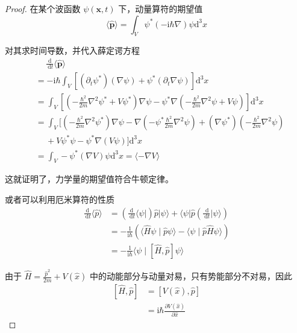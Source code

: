 \begin{proof}
在某个波函数 $\psi(\mathbf{x}, t)$ 下，动量算符的期望值
$$\langle\hat{\mathbf{p}}\rangle
=\int_{V} \psi^{*}(-\mathrm{i} \hbar \nabla) \psi \mathrm{d}^{3} x$$

对其求时间导数，并代入薛定谔方程
$$
\begin{aligned}
& \quad\ \frac{\mathrm{d}}{\mathrm{~d} t}\langle\hat{\mathbf{p}}\rangle \\
&= -\mathrm{i} \hbar \int_{V}\left[\left(\partial_{t} \psi^{*}\right)(\nabla \psi)+\psi^{*}\left(\partial_{t} \nabla \psi\right)\right] \mathrm{d}^{3} x \\
&= \int_{V}\left[\left(-\frac{\hbar^{2}}{2m} \nabla^{2} \psi^{*}+V \psi^{*}\right) \nabla \psi-\psi^{*} \nabla\left(-\frac{\hbar^{2}}{2m} \nabla^{2} \psi+V \psi\right)\right] \mathrm{d}^{3} x \\
&= \int_{V}\bigg[\left(-\frac{\hbar^{2}}{2m} \nabla^{2} \psi^{*}\right) \nabla \psi-\nabla\left(-\psi^{*} \frac{\hbar^{2}}{2m} \nabla^{2} \psi\right)+\left(\nabla \psi^{*}\right)\left(-\frac{\hbar^{2}}{2m} \nabla^{2} \psi\right) \\
& \quad\ +V \psi^{*} \psi-\psi^{*} \nabla(V \psi)\bigg] \mathrm{d}^{3} x \\
&= \int_{V}-\psi^{*}(\nabla V) \psi \mathrm{d}^{3} x=\langle-\nabla V\rangle
\end{aligned}
$$

这就证明了，力学量的期望值符合牛顿定律。

或者可以利用厄米算符的性质
$$
\begin{aligned}
\frac{\mathrm{d}}{\mathrm{~d} t}\langle\hat{p}\rangle & =\left(\frac{\mathrm{d}}{\mathrm{~d} t}\langle\psi|\right) \hat{p}|\psi\rangle+\langle\psi| \hat{p}\left(\frac{\mathrm{~d}}{\mathrm{~d} t}|\psi\rangle\right) \\
& =-\frac{1}{\mathrm{i} \hbar}(\langle\hat{H} \psi \mid \hat{p} \psi\rangle-\langle\psi \mid \hat{p} \hat{H} \psi\rangle) \\
& =-\frac{1}{\mathrm{i} \hbar}\langle\psi \mid[\hat{H}, \hat{p}] \psi\rangle
\end{aligned}
$$

由于 $\hat{H}=\frac{\hat{p}^{2}}{2 m}+V(\hat{x})$ 中的动能部分与动量对易，只有势能部分不对易，因此
$$
\begin{aligned}
{[\hat{H}, \hat{p}] } & =[V(\hat{x}), \hat{p}] \\
& =\mathrm{i} \hbar \frac{\partial V(\hat{x})}{\partial \hat{x}}
\end{aligned}
$$
\end{proof}



